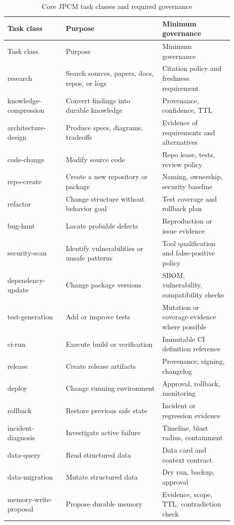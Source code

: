 \documentclass[10pt,journal,onecolumn]{IEEEtran}
\begin{document}
\begin{longtable}{p{0.23\linewidth}p{0.38\linewidth}p{0.29\linewidth}}
\caption{Core JPCM task classes and required governance}\label{tab:tasks}\\
\toprule
Task class & Purpose & Minimum governance\\
\midrule
\endfirsthead
\toprule
Task class & Purpose & Minimum governance\\
\midrule
\endhead
research & Search sources, papers, docs, repos, or logs & Citation policy and freshness requirement\\
knowledge-compression & Convert findings into durable knowledge & Provenance, confidence, TTL\\
architecture-design & Produce specs, diagrams, tradeoffs & Evidence of requirements and alternatives\\
code-change & Modify source code & Repo lease, tests, review policy\\
repo-create & Create a new repository or package & Naming, ownership, security baseline\\
refactor & Change structure without behavior goal & Test coverage and rollback plan\\
bug-hunt & Locate probable defects & Reproduction or issue evidence\\
security-scan & Identify vulnerabilities or unsafe patterns & Tool qualification and false-positive policy\\
dependency-update & Change package versions & SBOM, vulnerability, compatibility checks\\
test-generation & Add or improve tests & Mutation or coverage evidence where possible\\
ci-run & Execute build or verification & Immutable CI definition reference\\
release & Create release artifacts & Provenance, signing, changelog\\
deploy & Change running environment & Approval, rollback, monitoring\\
rollback & Restore previous safe state & Incident or regression evidence\\
incident-diagnosis & Investigate active failure & Timeline, blast radius, containment\\
data-query & Read structured data & Data card and context contract\\
data-migration & Mutate structured data & Dry run, backup, approval\\
memory-write-proposal & Propose durable memory & Evidence, scope, TTL, contradiction check\\

\end{longtable}
\end{document}
